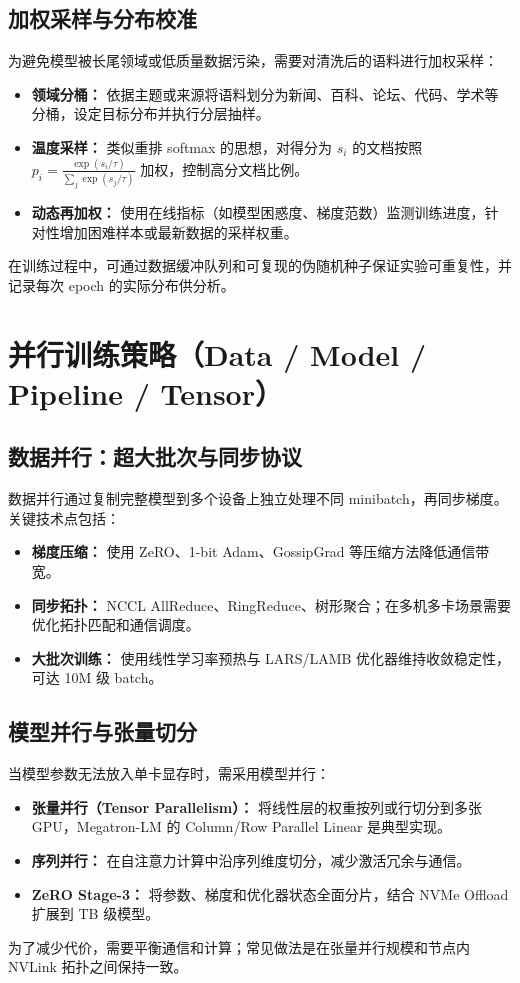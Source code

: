 \documentclass[UTF8,zihao=-4]{ctexart}
\begin{document}
\subsection{加权采样与分布校准}
为避免模型被长尾领域或低质量数据污染，需要对清洗后的语料进行加权采样：
\begin{itemize}
  \item \textbf{领域分桶：} 依据主题或来源将语料划分为新闻、百科、论坛、代码、学术等分桶，设定目标分布并执行分层抽样。
  \item \textbf{温度采样：} 类似重排 softmax 的思想，对得分为 $s_i$ 的文档按照 $p_i = \frac{\exp(s_i/\tau)}{\sum_j \exp(s_j/\tau)}$ 加权，控制高分文档比例。
  \item \textbf{动态再加权：} 使用在线指标（如模型困惑度、梯度范数）监测训练进度，针对性增加困难样本或最新数据的采样权重。
\end{itemize}
在训练过程中，可通过数据缓冲队列和可复现的伪随机种子保证实验可重复性，并记录每次 epoch 的实际分布供分析。

\section{并行训练策略（Data / Model / Pipeline / Tensor）}
\subsection{数据并行：超大批次与同步协议}
数据并行通过复制完整模型到多个设备上独立处理不同 minibatch，再同步梯度。关键技术点包括：
\begin{itemize}
  \item \textbf{梯度压缩：} 使用 ZeRO、1-bit Adam、GossipGrad 等压缩方法降低通信带宽。
  \item \textbf{同步拓扑：} NCCL AllReduce、RingReduce、树形聚合；在多机多卡场景需要优化拓扑匹配和通信调度。
  \item \textbf{大批次训练：} 使用线性学习率预热与 LARS/LAMB 优化器维持收敛稳定性，可达 10M 级 batch。
\end{itemize}

\subsection{模型并行与张量切分}
当模型参数无法放入单卡显存时，需采用模型并行：
\begin{itemize}
  \item \textbf{张量并行（Tensor Parallelism）：} 将线性层的权重按列或行切分到多张 GPU，Megatron-LM 的 Column/Row Parallel Linear 是典型实现。
  \item \textbf{序列并行：} 在自注意力计算中沿序列维度切分，减少激活冗余与通信。
  \item \textbf{ZeRO Stage-3：} 将参数、梯度和优化器状态全面分片，结合 NVMe Offload 扩展到 TB 级模型。
\end{itemize}
为了减少代价，需要平衡通信和计算；常见做法是在张量并行规模和节点内 NVLink 拓扑之间保持一致。
\end{document}
